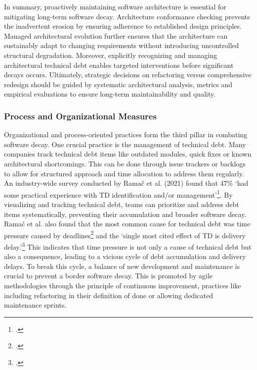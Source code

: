 In summary, proactively maintaining software architecture is essential for mitigating long-term software decay. Architecture conformance checking 
prevents the inadvertent erosion by ensuring adherence to established design principles. Managed architectural evolution further ensures that the architecture
can sustainably adapt to changing requirements without introducing uncontrolled structural degradation. Moreover, explicitly recognizing and managing architectural
technical debt enables targeted interventions before significant decays occurs. Ultimately, strategic decisions on refactoring versus comprehensive redesign should be 
guided by systematic architectural analysis, metrics and empirical evaluations to ensure long-term maintainability and quality.

\subsubsection{Process and Organizational Measures}
Organizational and process-oriented practices form the third pillar in combating software decay.
One crucial practice is the management of technical debt. Many companies track technical debt items like outdated modules, quick fixes or known architectural shortcomings.
This can be done through issue trackers or backlogs to allow for structured approach and time allocation to address them regularly.
An industry-wide survey conducted by Ramač et al. (2021) found that 47\% `had some practical experience with TD identification and/or management'\footcite[40]{ramacPrevalenceCommonCauses2021}.
By visualizing and tracking technical debt, teams can prioritize and address debt items systematically, preventing their accumulation and broader software decay.
Ramač et al. also found that the most common cause for technical debt was time pressure caused by deadlines\footcite[40]{ramacPrevalenceCommonCauses2021} and the `single most cited effect of TD is delivery delay.'\footcite[40]{ramacPrevalenceCommonCauses2021}
This indicates that time pressure is not only a cause of technical debt but also a consequence, leading to a vicious cycle of debt accumulation and delivery delays. To break this cycle, a balance of new development and maintenance is crucial to prevent a border software decay.
This is promoted by agile methodologies through the principle of continuous improvement, practices like including refactoring in their definition of done or allowing dedicated maintenance sprints.

